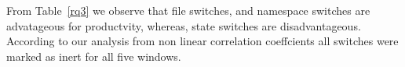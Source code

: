 From Table~\ref{rq3} we observe that file switches, and namespace switches are advatageous for productvity, whereas, state switches are disadvantageous. According to our analysis from non linear correlation coeffcients all switches were marked as inert for all five windows. 










